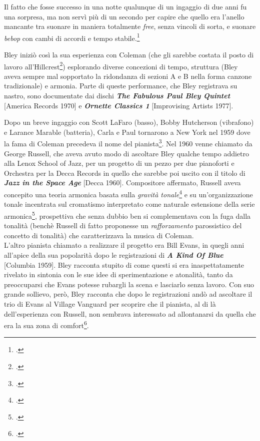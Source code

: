 \begin{fquote}
	Il fatto che fosse successo in una notte qualunque di un ingaggio di due anni fu una sorpresa, ma non servì più di un secondo per capire che quello era l'anello mancante tra suonare in maniera totalmente \textit{free}, senza vincoli di sorta, e suonare \textit{bebop} con cambi di accordi e tempo stabile.\footcite[64]{stopping}
\end{fquote}
Bley iniziò così la sua esperienza con Coleman (che gli sarebbe costata il posto di lavoro all'Hillcrest\footcite[51]{cappelletti}) esplorando diverse concezioni di tempo, struttura (Bley aveva sempre mal sopportato la ridondanza di sezioni A e B nella forma canzone tradizionale) e armonia. Parte di queste performance, che Bley registrava su nastro, sono documentate dai dischi \textbf{\textit{The Fabulous Paul Bley Quintet}} [America Records 1970] e \textbf{\textit{Ornette Classics 1}} [Improvising Artists 1977]. \par
Dopo un breve ingaggio con Scott LaFaro (basso), Bobby Hutcherson (vibrafono) e Larance Marable (batteria), Carla e Paul tornarono a New York nel 1959 dove la fama di Coleman precedeva il nome del pianista\footcite[70]{stopping}. Nel 1960 venne chiamato da George Russell, che aveva avuto modo di ascoltare Bley qualche tempo addietro alla Lenox School of Jazz, per un progetto di un pezzo per due pianoforti e Orchestra per la Decca Records in quello che sarebbe poi uscito con il titolo di \textit{\textbf{Jazz in the Space Age}} [Decca 1960]. Compositore affermato, Russell aveva concepito una teoria armonica basata sulla \textit{gravità tonale}\footcite[3]{russell} e su un'organizzazione tonale incentrata sul cromatismo interpretato come naturale estensione della serie armonica\footcite[12]{russell}, prospettiva che senza dubbio ben si complementava con la fuga dalla tonalità (benchè Russell di fatto proponesse un \textit{rafforzamento} parossistico del concetto di tonalità) che caratterizzava la musica di Coleman.\\
L'altro pianista chiamato a realizzare il progetto era Bill Evans, in quegli anni all'apice della sua popolarità dopo le registrazioni di \textit{\textbf{A Kind Of Blue}} [Columbia 1959]. Bley racconta stupito di come questi si era inaspettatamente rivelato in sintonia con le sue idee di sperimentazione e atonalità, tanto da preoccuparsi che Evans potesse rubargli la scena e lasciarlo senza lavoro. Con suo grande sollievo, però, Bley racconta che dopo le registrazioni andò ad ascoltare il trio di Evans al Village Vanguard per scoprire che il pianista, al di là dell'esperienza con Russell, non sembrava interessato ad allontanarsi da quella che era la sua zona di comfort\footcite[75]{stopping}.\par
